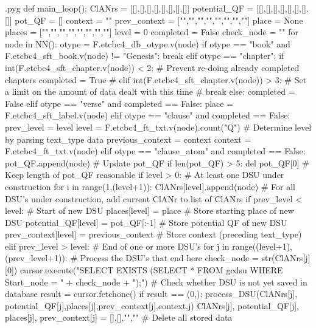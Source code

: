 \documentclass{report}
\makeatletter
\newenvironment{python}{%
  \VerbatimEnvironment
  \minted@resetoptions
  \setkeys{minted@opt}{}
      \begin{VerbatimOut}{\jobname.pyg}}
{%
      \end{VerbatimOut}
      \minted@pygmentize{python}
      \DeleteFile{\jobname.pyg}}
\makeatother
\begin{document}
\begin{python}
def main_loop():
    ClANrs =       [[],[],[],[],[],[],[],[]]
    potential_QF = [[],[],[],[],[],[],[],[]]
    pot_QF = []
    context = ""
    prev_context = ["","","","","","","",""]
    place = None
    places =       ["","","","","","","",""]
    level = 0
    completed = False
    check_node = ""
    for node in NN():
        otype = F.etcbc4_db_otype.v(node)
        if otype == "book" and F.etcbc4_sft_book.v(node) != "Genesis":
            break
        elif otype == "chapter":
            if int(F.etcbc4_sft_chapter.v(node)) < 2:    # Prevent re-doing already completed chapters
                completed = True
#            elif int(F.etcbc4_sft_chapter.v(node)) > 3:    # Set a limit on the amount of data dealt with this time
#                break
            else:
                completed = False
        elif otype == "verse" and completed == False:
            place = F.etcbc4_sft_label.v(node)
        elif otype == "clause" and completed == False:
            prev_level = level
            level = F.etcbc4_ft_txt.v(node).count("Q")      # Determine level by parsing text_type data
            previous_context = context
            context = F.etcbc4_ft_txt.v(node)
        elif otype == "clause_atom" and completed == False:
            pot_QF.append(node)     # Update pot_QF
            if len(pot_QF) > 5:
                del pot_QF[0]       # Keep length of pot_QF reasonable
            if level > 0:           # At least one DSU under construction
                for i in range(1,(level+1)):
                    ClANrs[level].append(node)   # For all DSU's under construction, add current ClANr to list of ClANrs
            if prev_level < level:                  # Start of new DSU
                places[level] = place               # Store starting place of new DSU
                potential_QF[level] = pot_QF[:-1]   # Store potential QF of new DSU
                prev_context[level] = previous_context    # Store context (preceding text_type)
            elif prev_level > level:                # End of one or more DSU's
                for j in range((level+1),(prev_level+1)): # Process the DSU's that end here
                    check_node = str(ClANrs[j][0])
                    cursor.execute("SELECT EXISTS (SELECT * FROM gcdsu WHERE Start_node = " + check_node + ");") # Check whether DSU is not yet saved in database
                    result = cursor.fetchone()
                    if result == (0,):
                        process_DSU(ClANrs[j], potential_QF[j],places[j],prev_context[j],context,j)
                    ClANrs[j], potential_QF[j], places[j], prev_context[j] = [],[],"",""    # Delete all stored data

\end{python}
\end{document}
